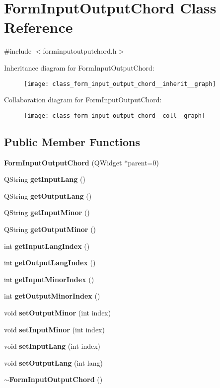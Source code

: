 \section{Form\+Input\+Output\+Chord Class Reference}
\label{class_form_input_output_chord}


{\ttfamily \#include $<$forminputoutputchord.\+h$>$}



Inheritance diagram for Form\+Input\+Output\+Chord\+:\nopagebreak
\begin{figure}[H]
\begin{center}
\leavevmode
\texttt{[image: class\_form\_input\_output\_chord\_\_inherit\_\_graph]}
\end{center}
\end{figure}


Collaboration diagram for Form\+Input\+Output\+Chord\+:\nopagebreak
\begin{figure}[H]
\begin{center}
\leavevmode
\texttt{[image: class\_form\_input\_output\_chord\_\_coll\_\_graph]}
\end{center}
\end{figure}
\subsection*{Public Member Functions}
\begin{DoxyCompactItemize}
\item 
\textbf{ Form\+Input\+Output\+Chord} (Q\+Widget $\ast$parent=0)
\item 
Q\+String \textbf{ get\+Input\+Lang} ()
\item 
Q\+String \textbf{ get\+Output\+Lang} ()
\item 
Q\+String \textbf{ get\+Input\+Minor} ()
\item 
Q\+String \textbf{ get\+Output\+Minor} ()
\item 
int \textbf{ get\+Input\+Lang\+Index} ()
\item 
int \textbf{ get\+Output\+Lang\+Index} ()
\item 
int \textbf{ get\+Input\+Minor\+Index} ()
\item 
int \textbf{ get\+Output\+Minor\+Index} ()
\item 
void \textbf{ set\+Output\+Minor} (int index)
\item 
void \textbf{ set\+Input\+Minor} (int index)
\item 
void \textbf{ set\+Input\+Lang} (int index)
\item 
void \textbf{ set\+Output\+Lang} (int lang)
\item 
\textbf{ $\sim$\+Form\+Input\+Output\+Chord} ()
\end{DoxyCompactItemize}


